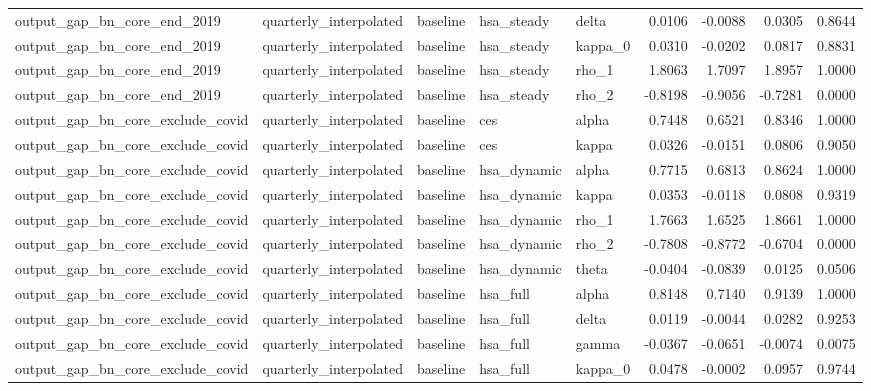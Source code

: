 \begin{tabular}{lllllrrrr}
output\_gap\_bn\_core\_end\_2019 & quarterly\_interpolated & baseline & hsa\_steady & delta & 0.0106 & -0.0088 & 0.0305 & 0.8644 \\
output\_gap\_bn\_core\_end\_2019 & quarterly\_interpolated & baseline & hsa\_steady & kappa\_0 & 0.0310 & -0.0202 & 0.0817 & 0.8831 \\
output\_gap\_bn\_core\_end\_2019 & quarterly\_interpolated & baseline & hsa\_steady & rho\_1 & 1.8063 & 1.7097 & 1.8957 & 1.0000 \\
output\_gap\_bn\_core\_end\_2019 & quarterly\_interpolated & baseline & hsa\_steady & rho\_2 & -0.8198 & -0.9056 & -0.7281 & 0.0000 \\
output\_gap\_bn\_core\_exclude\_covid & quarterly\_interpolated & baseline & ces & alpha & 0.7448 & 0.6521 & 0.8346 & 1.0000 \\
output\_gap\_bn\_core\_exclude\_covid & quarterly\_interpolated & baseline & ces & kappa & 0.0326 & -0.0151 & 0.0806 & 0.9050 \\
output\_gap\_bn\_core\_exclude\_covid & quarterly\_interpolated & baseline & hsa\_dynamic & alpha & 0.7715 & 0.6813 & 0.8624 & 1.0000 \\
output\_gap\_bn\_core\_exclude\_covid & quarterly\_interpolated & baseline & hsa\_dynamic & kappa & 0.0353 & -0.0118 & 0.0808 & 0.9319 \\
output\_gap\_bn\_core\_exclude\_covid & quarterly\_interpolated & baseline & hsa\_dynamic & rho\_1 & 1.7663 & 1.6525 & 1.8661 & 1.0000 \\
output\_gap\_bn\_core\_exclude\_covid & quarterly\_interpolated & baseline & hsa\_dynamic & rho\_2 & -0.7808 & -0.8772 & -0.6704 & 0.0000 \\
output\_gap\_bn\_core\_exclude\_covid & quarterly\_interpolated & baseline & hsa\_dynamic & theta & -0.0404 & -0.0839 & 0.0125 & 0.0506 \\
output\_gap\_bn\_core\_exclude\_covid & quarterly\_interpolated & baseline & hsa\_full & alpha & 0.8148 & 0.7140 & 0.9139 & 1.0000 \\
output\_gap\_bn\_core\_exclude\_covid & quarterly\_interpolated & baseline & hsa\_full & delta & 0.0119 & -0.0044 & 0.0282 & 0.9253 \\
output\_gap\_bn\_core\_exclude\_covid & quarterly\_interpolated & baseline & hsa\_full & gamma & -0.0367 & -0.0651 & -0.0074 & 0.0075 \\
output\_gap\_bn\_core\_exclude\_covid & quarterly\_interpolated & baseline & hsa\_full & kappa\_0 & 0.0478 & -0.0002 & 0.0957 & 0.9744 \\

\end{tabular}
